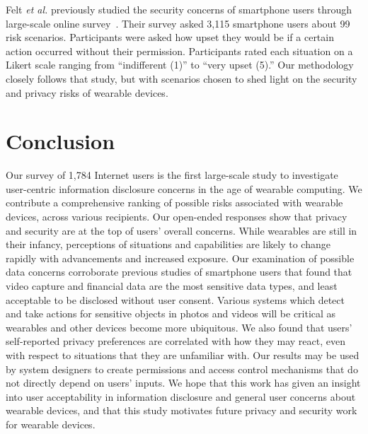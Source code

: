 \documentclass[conference]{IEEEtran}
\begin{document}
Felt {\it et al.} previously studied the security concerns of smartphone users through large-scale online survey~\cite{Felt}. Their survey asked 3,115 smartphone users about 99 risk scenarios. Participants were asked how upset they would be if a certain action occurred without their permission. Participants rated each situation on a Likert scale ranging from ``indifferent (1)'' to ``very upset (5).'' Our methodology closely follows that study, but with scenarios chosen to shed light on the security and privacy risks of wearable devices.

\section{Conclusion}

Our survey of 1,784 Internet users is the first large-scale study to investigate user-centric information disclosure concerns in the age of wearable computing. We contribute a comprehensive ranking of possible risks associated with wearable devices, across various recipients. Our open-ended responses show that privacy and security are at the top of users' overall concerns. While wearables are still in their infancy, perceptions of situations and capabilities are likely to change rapidly with advancements and increased exposure. Our examination of possible data concerns corroborate previous studies of smartphone users that found that video capture and financial data are the most sensitive data types, and least acceptable to be disclosed without user consent. Various systems which detect and take actions for sensitive objects in photos and videos will be critical as wearables and other devices become more ubiquitous. We also found that users' self-reported privacy preferences are correlated with how they may react, even with respect to situations that they are unfamiliar with. Our results may be used by system designers to create permissions and access control mechanisms that do not directly depend on users' inputs. We hope that this work has given an insight into user acceptability in information disclosure and general user concerns about wearable devices, and that this study motivates future privacy and security work for wearable devices. 


 

\newpage




\end{document}
